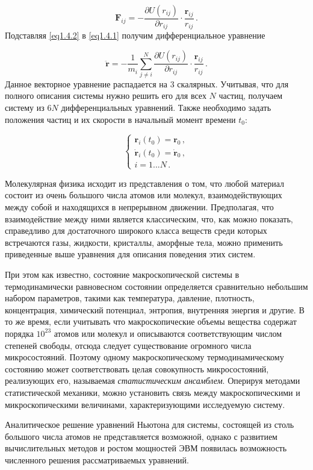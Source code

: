 \begin{equation}
    \mathbf{F}_{ij} = - \dfrac{\partial U(r_{ij})}{\partial r_{ij}}\cdot\dfrac{\mathbf{r}_{ij}}{r_{ij}}\,.
    \label{eq1.4.2}
\end{equation}
Подставляя \eqref{eq1.4.2} в \eqref{eq1.4.1} получим дифференциальное уравнение

\begin{equation}
    \mathbf{\ddot{r}} = -\dfrac{1}{m_i}\sum\limits_{j\neq i}^N \dfrac{\partial U(r_{ij})}{\partial r_{ij}}\cdot\dfrac{\mathbf{r}_{ij}}{r_{ij}}\,.
    \label{eq1.4.3}
\end{equation}
Данное векторное уравнение распадается на 3 скалярных. Учитывая, что для полного описания системы нужно решить его для всех $N$ частиц, получаем систему из $6N$ дифференциальных уравнений. Также необходимо задать положения частиц и их скорости в начальный момент времени $t_0$:

\begin{equation}
    \begin{cases}
        \mathbf{r}_{i}(t_0) = \mathbf{r}_0\, , \\
        \mathbf{\dot{r}}_{i}(t_0) = \mathbf{\dot{r}}_0\, , \\
        i = 1...N\,.
        \label{eq1.4.4}
    \end{cases}
\end{equation}

\par Молекулярная физика исходит из представления о том, что любой материал состоит из очень большого числа атомов или молекул, взаимодействующих между собой и находящихся в непрерывном движении. Предполагая, что взаимодействие между ними является классическим, что, как можно показать, справедливо для достаточного широкого класса веществ среди которых встречаются газы, жидкости, кристаллы, аморфные тела, можно применить приведенные выше уравнения для описания поведения этих систем.

\par При этом как известно, состояние макроскопической системы в термодинамически равновесном состоянии определяется сравнительно небольшим набором параметров, такими как температура, давление, плотность, концентрация, химический потенциал, энтропия, внутренняя энергия и другие. В то же время, если учитывать что макроскопические объемы вещества содержат порядка $10^{23}$ атомов или молекул и описываются соответствующим числом степеней свободы, отсюда следует существование огромного числа микросостояний. Поэтому одному макроскопическому термодинамическому состоянию может соответствовать целая совокупность микросостояний, реализующих его, называемая \textit{статистическим ансамблем}. Оперируя методами статистической механики, можно установить связь между макроскопическими и микроскопическими величинами, характеризующими исследуемую систему.

\par Аналитическое решение уравнений Ньютона для системы, состоящей из столь большого числа атомов не представляется возможной, однако с развитием вычислительных методов и ростом мощностей ЭВМ появилась возможность численного решения рассматриваемых уравнений.